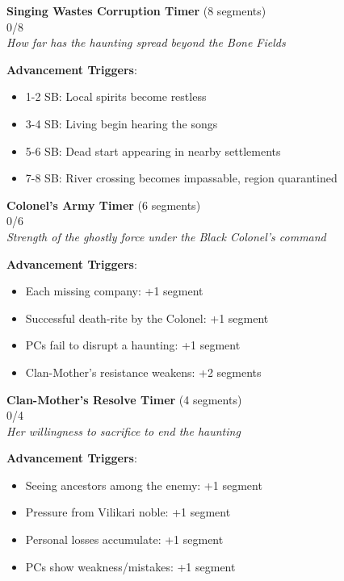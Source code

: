 \documentclass[11pt]{article}
\newcommand{\timersegment}{\textbullet}
\begin{document}
\begin{center}
\textbf{Singing Wastes Corruption Timer } (8 segments)\\
\fbox{\timersegment\timersegment\timersegment\timersegment\timersegment\timersegment\timersegment\timersegment} 0/8\\
\textit{How far has the haunting spread beyond the Bone Fields}
\end{center}

\textbf{Advancement Triggers}:
\begin{itemize}[leftmargin=*]
\item 1-2 SB: Local spirits become restless
\item 3-4 SB: Living begin hearing the songs
\item 5-6 SB: Dead start appearing in nearby settlements
\item 7-8 SB: River crossing becomes impassable, region quarantined
\end{itemize}

\begin{center}
\textbf{Colonel's Army Timer } (6 segments)\\
\fbox{\timersegment\timersegment\timersegment\timersegment\timersegment\timersegment} 0/6\\
\textit{Strength of the ghostly force under the Black Colonel's command}
\end{center}

\textbf{Advancement Triggers}:
\begin{itemize}[leftmargin=*]
\item Each missing company: +1 segment
\item Successful death-rite by the Colonel: +1 segment
\item PCs fail to disrupt a haunting: +1 segment
\item Clan-Mother's resistance weakens: +2 segments
\end{itemize}

\begin{center}
\textbf{Clan-Mother's Resolve Timer } (4 segments)\\
\fbox{\timersegment\timersegment\timersegment\timersegment} 0/4\\
\textit{Her willingness to sacrifice to end the haunting}
\end{center}

\textbf{Advancement Triggers}:
\begin{itemize}[leftmargin=*]
\item Seeing ancestors among the enemy: +1 segment
\item Pressure from Vilikari noble: +1 segment
\item Personal losses accumulate: +1 segment
\item PCs show weakness/mistakes: +1 segment
\end{itemize}
\end{document}
